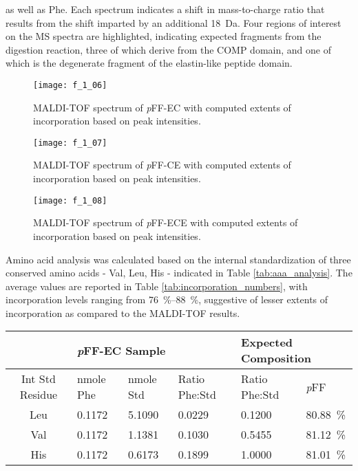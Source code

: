 \begin{refsection}
as well as Phe. Each spectrum indicates a shift in mass-to-charge ratio that
results from the shift imparted by an additional \SI{18}{\dalton}. Four regions
of interest on the MS spectra are highlighted, indicating expected fragments
from the digestion reaction, three of which derive from the COMP domain, and one
of which is the degenerate fragment of the elastin-like peptide domain.
\begin{figure}[h!] \centering \texttt{[image: f\_1\_06]}
    \caption{MALDI-TOF spectrum of \emph{p}FF-EC with computed extents of
incorporation based on peak intensities.} \label{fig:MALDI_spectrum_EC} \end{figure}
\begin{figure}[h!] \centering \texttt{[image: f\_1\_07]}
    \caption{MALDI-TOF spectrum of \emph{p}FF-CE with computed extents of
incorporation based on peak intensities.} \label{fig:MALDI_spectrum_CE} \end{figure}
\begin{figure}[h!] \centering \texttt{[image: f\_1\_08]}
    \caption{MALDI-TOF spectrum of \emph{p}FF-ECE with computed extents of
incorporation based on peak intensities.} \label{fig:MALDI_spectrum_ECE} \end{figure}
Amino acid analysis was calculated based on the internal standardization of
three conserved amino acids - Val, Leu, His - indicated in Table
\ref{tab:aaa_analysis}. The average values are reported in
Table \ref{tab:incorporation_numbers}, with incorporation levels ranging from
\SIrange{76}{88}{\percent}, suggestive of lesser extents of incorporation as
compared to the MALDI-TOF results. 
\begin{table}[h!]
    \centering
\begin{tabular}{ clllll }
  \hline
  &
  \multicolumn{3}{l}{\emph{p}FF-EC Sample} &
  \multicolumn{2}{l}{Expected Composition} \\
  \hline
  Int Std Residue & nmole Phe & nmole Std & Ratio Phe:Std & Ratio Phe:Std& \emph{p}FF \\
  Leu & 0.1172 & 5.1090 & 0.0229 & 0.1200 & \SI{80.88}{\percent} \\
  Val & 0.1172 & 1.1381 & 0.1030 & 0.5455 & \SI{81.12}{\percent} \\
  His & 0.1172 & 0.6173 & 0.1899 & 1.0000 & \SI{81.01}{\percent} \\

\end{tabular}
\end{table}
\end{refsection}
